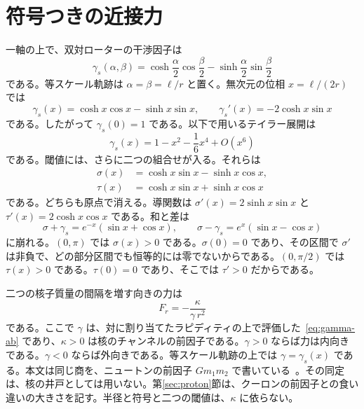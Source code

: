 \documentclass[a4paper]{article}
\begin{document}
\section{符号つきの近接力}
\label{sec:force}

一軸の上で、双対ローターの干渉因子は
\begin{equation}
\label{eq:gamma-ab}
\gamma_s(\alpha,\beta)
  =\cosh\frac{\alpha}{2}\cos\frac{\beta}{2}
  -\sinh\frac{\alpha}{2}\sin\frac{\beta}{2}
\end{equation}
である。等スケール軌跡は \(\alpha=\beta=\ell/r\) と置く。無次元の位相 \(x=\ell/(2r)\) では
\begin{equation}
\label{eq:gamma}
\gamma_s(x)=\cosh x\cos x-\sinh x\sin x,
\qquad
\gamma_s'(x)=-2\cosh x\sin x
\end{equation}
である。したがって \(\gamma_s(0)=1\) である。以下で用いるテイラー展開は
\begin{equation}
\label{eq:series}
\gamma_s(x)=1-x^{2}-\frac16 x^{4}+O(x^{6})
\end{equation}
である。閾値には、さらに二つの組合せが入る。それらは
\begin{align}
\label{eq:sigma}
\sigma(x)&=\cosh x\sin x-\sinh x\cos x,\\
\label{eq:tau}
\tau(x)&=\cosh x\sin x+\sinh x\cos x
\end{align}
である。どちらも原点で消える。導関数は \(\sigma'(x)=2\sinh x\sin x\) と \(\tau'(x)=2\cosh x\cos x\) である。和と差は
\begin{equation}
\label{eq:sumdiff}
\sigma+\gamma_s=e^{-x}(\sin x+\cos x),
\qquad
\sigma-\gamma_s=e^{x}(\sin x-\cos x)
\end{equation}
に崩れる。\((0,\pi)\) では \(\sigma(x)>0\) である。\(\sigma(0)=0\) であり、その区間で \(\sigma'\) は非負で、どの部分区間でも恒等的には零でないからである。\((0,\pi/2)\) では \(\tau(x)>0\) である。\(\tau(0)=0\) であり、そこでは \(\tau'>0\) だからである。

二つの核子質量の間隔を増す向きの力は
\begin{equation}
\label{eq:force}
F_r=-\frac{\kappa}{\gamma\,r^{2}}
\end{equation}
である。ここで \(\gamma\) は、対に割り当てたラピディティの上で評価した~\eqref{eq:gamma-ab} であり、\(\kappa>0\) は核のチャンネルの前因子である。\(\gamma>0\) ならば力は内向きである。\(\gamma<0\) ならば外向きである。等スケール軌跡の上では \(\gamma=\gamma_s(x)\) である。本文は同じ商を、ニュートンの前因子 \(G m_1 m_2\) で書いている~\cite{dst-main}。その同定は、核の井戸としては用いない。第\ref{sec:proton}節は、クーロンの前因子との食い違いの大きさを記す。半径と符号と二つの閾値は、\(\kappa\) に依らない。
\end{document}
